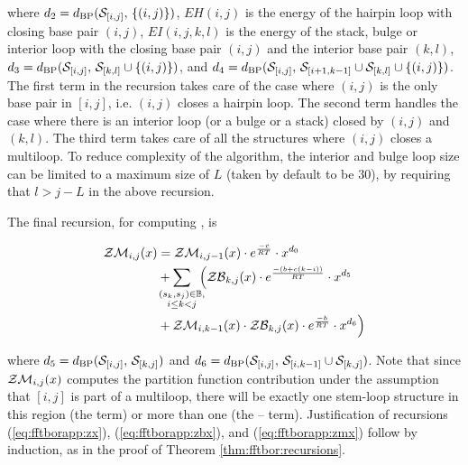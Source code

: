 where $d_2 = d_{\text{BP}}(\mathcal S_{[i,j]},\,\{(i,j)\})$,
$EH(i,j)$ is the energy of the hairpin loop with closing base
pair $(i,j)$, $EI(i,j,k,l)$ is the energy of the stack, bulge or
interior loop with the closing base pair $(i,j)$ and the interior
base pair $(k,l)$, $d_3 = d_{\text{BP}}(\mathcal S_{[i,j]},\,\mathcal S_{[k,l]} \cup
\{(i,j)\})$, and $d_4 = d_{\text{BP}}(\mathcal S_{[i,j]},\,\mathcal S_{[i+1,k-1]} \cup
\mathcal S_{[k,l]} \cup\{(i,j)\})$. The first term in the
recursion takes care of the case where $(i,j)$ is the only base pair
in $[i,j]$, i.e. $(i,j)$ closes a hairpin loop. The second term
handles the case where there is an interior loop (or a bulge or a
stack) closed by $(i,j)$ and $(k,l)$. The third term takes care of
all the structures where $(i,j)$ closes a multiloop. To reduce
complexity of the algorithm, the interior and bulge loop size can be
limited to a maximum size of $L$ (taken by default to be $30$),
by requiring that $l>j-L$ in the above recursion.

The final recursion, for computing \emZM{}, is

\begin{align}
\label{eq:fftborapp:zmx}
\begin{split}
\emZM{i,j} &= \emZM{i,j-1} \cdot \boltzE{c} \cdot x^{d_0} \\
&+ \sum_{\mathclap{\substack{(s_k,s_j) \in \bpSet, \\ i \leq k < j }}}\enspace
\Big( \emZB{k,j} \cdot \boltzE{(b+c(k-i))} \cdot x^{d_5} \\
&+ \emZM{i,k-1} \cdot \emZB{k,j} \cdot \boltzE{b} \cdot x^{d_6} \Big)
\end{split}
\end{align}

where $d_5 = d_{\text{BP}}(\mathcal S_{[i,j]},\,\mathcal S_{[k,j]})$ and $d_6
=d_{\text{BP}}(\mathcal S_{[i,j]},\,\mathcal S_{[i,k-1]} \cup \mathcal S_{[k,j]})$.
Note that since $\mathcal{ZM}_{i,j}(x)$ computes the partition function
contribution under the assumption that $[i,j]$ is part of a
multiloop, there will be exactly one stem-loop structure in this
region (the \emZB{} term) or
more than one (the \emZM{}--\emZB{} term).
Justification of recursions (\ref{eq:fftborapp:zx}),
(\ref{eq:fftborapp:zbx}), and
(\ref{eq:fftborapp:zmx})
follow by induction, as in the proof of Theorem \ref{thm:fftbor:recursions}.
